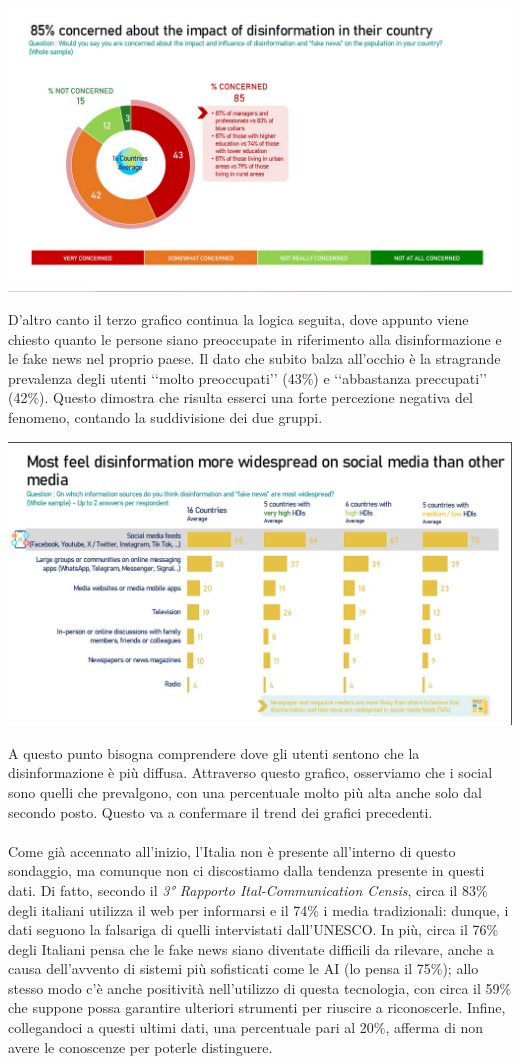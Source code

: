 \documentclass{article}
\begin{document}
\begin{justify}
\begin{center}
\includegraphics[width=0.6\linewidth]{Immagini/Grafico3.jpg}
\end{center}
    D'altro canto il terzo grafico continua la logica seguita, dove appunto viene chiesto quanto le persone siano preoccupate in riferimento alla disinformazione e le fake news nel proprio paese.
    Il dato che subito balza all'occhio è la stragrande prevalenza degli utenti ‘‘molto preoccupati’’ (43\%) e ‘‘abbastanza preccupati’’ (42\%). Questo dimostra che risulta esserci una forte percezione negativa del fenomeno, contando la suddivisione dei due gruppi.

\begin{center}
\includegraphics[width=0.6\linewidth]{Immagini/Grafico4.jpg}
\end{center}
    A questo punto bisogna comprendere dove gli utenti sentono che la disinformazione è più diffusa. Attraverso questo grafico, osserviamo che i social sono quelli che prevalgono, con una percentuale molto più alta anche solo dal secondo posto. Questo va a confermare il trend dei grafici precedenti.\\
    \\
    Come già accennato all'inizio, l'Italia non è presente all'interno di questo sondaggio, ma comunque non ci discostiamo dalla tendenza presente in questi dati.
    Di fatto, secondo il \textit{3° Rapporto Ital-Communication Censis}, circa il 83\% degli italiani utilizza il web per informarsi e il 74\% i media tradizionali: dunque, i dati seguono la falsariga di quelli intervistati dall'UNESCO.
    In più, circa il 76\% degli Italiani pensa che le fake news siano diventate difficili da rilevare, anche a causa dell'avvento di sistemi più sofisticati come le AI (lo pensa il 75\%); allo stesso modo c'è anche positività nell'utilizzo di questa tecnologia, con circa il 59\% che suppone possa garantire ulteriori strumenti per riuscire a riconoscerle.
    Infine, collegandoci a questi ultimi dati, una percentuale pari al 20\%, afferma di non avere le conoscenze per poterle distinguere.\citep{chiariello_disinformazione_2023}
\end{justify}
\end{document}
